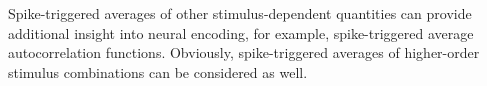 \begin{rem}
  Spike-triggered averages of other stimulus-dependent quantities can provide additional insight into neural encoding, for example, spike-triggered average autocorrelation functions. Obviously, spike-triggered averages of higher-order stimulus combinations can be considered as well.
\end{rem}

